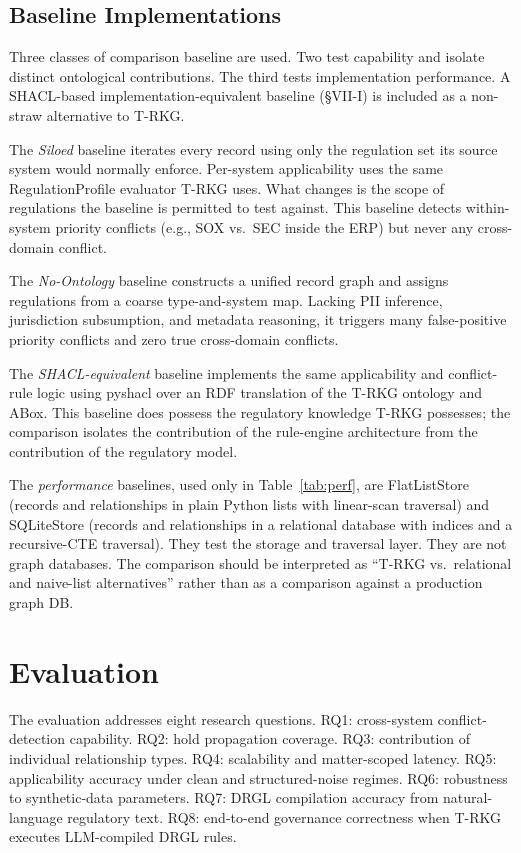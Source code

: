 \documentclass{ieeeaccess}
\begin{document}
\subsection{Baseline Implementations}

Three classes of comparison baseline are used. Two test capability and isolate distinct ontological contributions. The third tests implementation performance. A SHACL-based implementation-equivalent baseline (§VII-I) is included as a non-straw alternative to T-RKG.

The \textit{Siloed} baseline iterates every record using only the regulation set its source system would normally enforce. Per-system applicability uses the same RegulationProfile evaluator T-RKG uses. What changes is the scope of regulations the baseline is permitted to test against. This baseline detects within-system priority conflicts (e.g., SOX vs.\ SEC inside the ERP) but never any cross-domain conflict.

The \textit{No-Ontology} baseline constructs a unified record graph and assigns regulations from a coarse type-and-system map. Lacking PII inference, jurisdiction subsumption, and metadata reasoning, it triggers many false-positive priority conflicts and zero true cross-domain conflicts.

The \textit{SHACL-equivalent} baseline implements the same applicability and conflict-rule logic using pyshacl over an RDF translation of the T-RKG ontology and ABox. This baseline does possess the regulatory knowledge T-RKG possesses; the comparison isolates the contribution of the rule-engine architecture from the contribution of the regulatory model.

The \textit{performance} baselines, used only in Table~\ref{tab:perf}, are FlatListStore (records and relationships in plain Python lists with linear-scan traversal) and SQLiteStore (records and relationships in a relational database with indices and a recursive-CTE traversal). They test the storage and traversal layer. They are not graph databases. The comparison should be interpreted as ``T-RKG vs.\ relational and naive-list alternatives'' rather than as a comparison against a production graph DB.

\section{Evaluation}
\label{sec:eval}

The evaluation addresses eight research questions. RQ1: cross-system conflict-detection capability. RQ2: hold propagation coverage. RQ3: contribution of individual relationship types. RQ4: scalability and matter-scoped latency. RQ5: applicability accuracy under clean and structured-noise regimes. RQ6: robustness to synthetic-data parameters. RQ7: DRGL compilation accuracy from natural-language regulatory text. RQ8: end-to-end governance correctness when T-RKG executes LLM-compiled DRGL rules.
\end{document}
